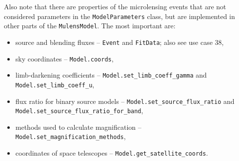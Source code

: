 \documentclass[12pt]{article}
\begin{document}
Also note that there are properties of the microlensing events that are not considered parameters in the \texttt{ModelParameters} class, but are implemented in other parts of the \texttt{MulensModel}. The most important are:
\begin{itemize}
 \item source and blending fluxes -- \texttt{Event} and \texttt{FitData}; also see use case 38,
 \item sky coordinates -- \texttt{Model.coords},
 \item limb-darkening coefficients -- \texttt{Model.set\_limb\_coeff\_gamma} and \texttt{Model.set\_limb\_coeff\_u},
 \item flux ratio for binary source models -- \texttt{Model.set\_source\_flux\_ratio} and\\ \texttt{Model.set\_source\_flux\_ratio\_for\_band},
 \item methods used to calculate magnification -- \texttt{Model.set\_magnification\_methods},
 \item coordinates of space telescopes -- \texttt{Model.get\_satellite\_coords}.
\end{itemize}
\end{document}
